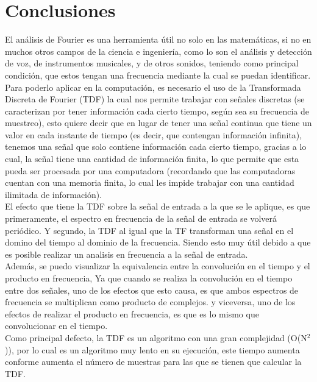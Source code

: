 \section{Conclusiones}
El análisis de Fourier es una herramienta útil no solo en las matemáticas, si no en muchos otros campos de la ciencia e ingeniería, como lo son el análisis y detección de voz, de instrumentos musicales, y de otros sonidos, teniendo como principal condición, que estos tengan una frecuencia mediante la cual se puedan identificar. Para poderlo aplicar en la computación, es necesario el uso de la Transformada Discreta de Fourier (TDF) la cual nos permite trabajar con señales discretas (se caracterizan por tener información cada cierto tiempo, según sea su frecuencia de muestreo), esto quiere decir que en lugar de tener una señal continua que tiene un valor en cada instante de tiempo (es decir, que contengan información infinita), tenemos una señal que solo contiene información cada cierto tiempo, gracias a lo cual, la señal tiene una cantidad de información finita, lo que permite que esta pueda ser procesada por una computadora (recordando que las computadoras cuentan con una memoria finita, lo cual les impide trabajar con una cantidad ilimitada de información).\\ El efecto que tiene la TDF sobre la señal de entrada a la que se le aplique, es que primeramente, el espectro en frecuencia de la señal de entrada se volverá periódico. Y segundo, la TDF al igual que la TF transforman una señal en el domino del tiempo al dominio de la frecuencia. Siendo esto muy útil debido a que es posible realizar un analisis en frecuencia a la señal de entrada.\\ Además, se puedo visualizar la equivalencia entre la convolución en el tiempo y el producto en frecuencia, Ya que cuando se realiza la convolución en el tiempo entre dos señales, uno de los efectos que esto causa, es que ambos espectros de frecuencia se multiplican como producto de complejos. y viceversa, uno de los efectos de realizar el producto en frecuencia, es que es lo mismo que convolucionar en el tiempo.\\ Como principal defecto, la TDF es un algoritmo con una gran complejidad (O(N$ ^{2} $)), por lo cual es un algoritmo muy lento en su ejecución, este tiempo aumenta conforme aumenta el número de muestras para las que se tienen que calcular la TDF.\\